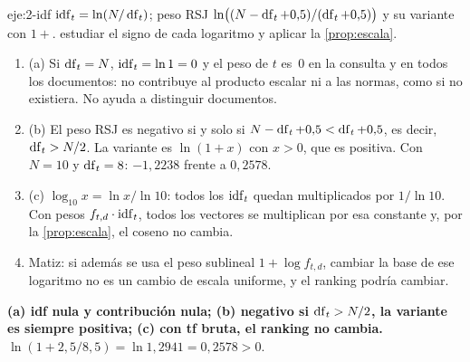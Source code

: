 \begin{solucion}{eje:2-idf}
\datos $\operatorname{idf}_t=\ln(N/\operatorname{df}_t)$; peso RSJ $\ln\bigl((N-\operatorname{df}_t+0{,}5)/(\operatorname{df}_t+0{,}5)\bigr)$ y su variante con $1+$.
\planteamiento estudiar el signo de cada logaritmo y aplicar la \cref{prop:escala}.
\pasos
\begin{enumerate}[label=\arabic*.]
  \item (a) Si $\operatorname{df}_t=N$, $\operatorname{idf}_t=\ln 1=0$ y el peso de $t$ es~0 en la consulta y en todos los documentos: no contribuye al producto escalar ni a las normas, como si no existiera. No ayuda a distinguir documentos.
  \item (b) El peso RSJ es negativo si y solo si $N-\operatorname{df}_t+0{,}5<\operatorname{df}_t+0{,}5$, es decir, $\operatorname{df}_t>N/2$. La variante es $\ln(1+x)$ con $x>0$, que es positiva. Con $N=10$ y $\operatorname{df}_t=8$: $-1{,}2238$ frente a $0{,}2578$.
  \item (c) $\log_{10}x=\ln x/\ln 10$: todos los $\operatorname{idf}_t$ quedan multiplicados por $1/\ln 10$. Con pesos $f_{t,d}\cdot\operatorname{idf}_t$, todos los vectores se multiplican por esa constante y, por la \cref{prop:escala}, el coseno no cambia.
  \item Matiz: si además se usa el peso sublineal $1+\log f_{t,d}$, cambiar la base de ese logaritmo no es un cambio de escala uniforme, y el ranking podría cambiar.
\end{enumerate}
\resultado \textbf{(a) idf nula y contribución nula; (b) negativo si $\operatorname{df}_t>N/2$, la variante es siempre positiva; (c) con tf bruta, el ranking no cambia.}
\comprobacion $\ln(1+2{,}5/8{,}5)=\ln 1{,}2941=0{,}2578>0$.
\end{solucion}

